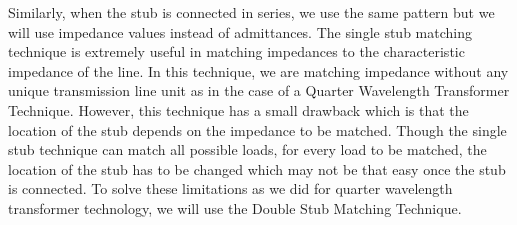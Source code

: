 Similarly, when the stub is connected in series, we use the same pattern but we will use impedance values instead of admittances. The single stub matching technique is extremely useful in matching impedances to the characteristic impedance of the line. In this technique, we are matching impedance without any unique transmission line unit as in the case of a Quarter Wavelength Transformer Technique. However, this technique has a small drawback which is that the location of the stub depends on the impedance to be matched. Though the single stub technique can match all possible loads, for every load to be matched, the location of the stub has to be changed which may not be that easy once the stub is connected. To solve these limitations as we did for quarter wavelength transformer technology, we will use the Double Stub Matching Technique.


